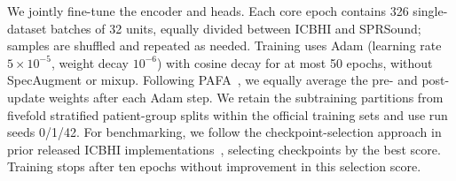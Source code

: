 We jointly fine-tune the encoder and heads. Each core epoch contains 326 single-dataset batches of 32 units, equally divided between ICBHI and SPRSound; samples are shuffled and repeated as needed. Training uses Adam (learning rate $5\times10^{-5}$, weight decay $10^{-6}$) with cosine decay for at most 50 epochs, without SpecAugment or mixup. Following PAFA~\cite{jeong2025pafa}, we equally average the pre- and post-update weights after each Adam step. We retain the subtraining partitions from fivefold stratified patient-group splits within the official training sets and use run seeds 0/1/42. For benchmarking, we follow the checkpoint-selection approach in prior released ICBHI implementations~\cite{bae2023patchmix,jeong2025pafa}, selecting checkpoints by the best score. Training stops after ten epochs without improvement in this selection score.
